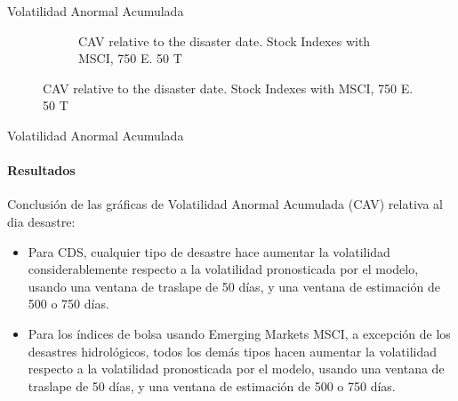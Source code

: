 \documentclass{beamer}
\begin{document}
\begin{frame}{Volatilidad Anormal Acumulada}
\begin{figure}
\begin{subfigure}{0.5\textwidth}
        \caption{CAV relative to the disaster date. Stock Indexes with MSCI, 750 E. 50 T}
        \label{figure:cavind75050}
    \end{subfigure}
\end{figure}
\end{frame}

\begin{frame}{Volatilidad Anormal Acumulada}
\framesubtitle{Resultados}
Conclusión de las gráficas de Volatilidad Anormal Acumulada (CAV) relativa al dia desastre:
\begin{itemize}
    \item Para CDS, cualquier tipo de desastre hace aumentar la volatilidad considerablemente respecto a la volatilidad pronosticada por el modelo, usando una ventana de traslape de 50 días, y una ventana de estimación de 500 o 750 días.
    \item Para los índices de bolsa usando Emerging Markets MSCI, a excepción de los desastres hidrológicos, todos los demás tipos hacen aumentar la volatilidad respecto a la volatilidad pronosticada por el modelo, usando una ventana de traslape de 50 días, y una ventana de estimación de 500 o 750 días.
\end{itemize}
\end{frame}
\end{document}
